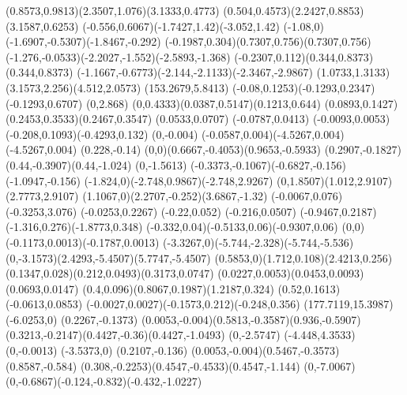 {    \rcurveto(0.8573,0.9813)(2.3507,1.076)(3.1333,0.4773)
    \rcurveto(0.504,0.4573)(2.2427,0.8853)(3.1587,0.6253)
    \rcurveto(-0.556,0.6067)(-1.7427,1.42)(-3.052,1.42)
    \rcurveto(-1.08,0)(-1.6907,-0.5307)(-1.8467,-0.292)
    \rcurveto(-0.1987,0.304)(0.7307,0.756)(0.7307,0.756)
    \rcurveto(-1.276,-0.0533)(-2.2027,-1.552)(-2.5893,-1.368)
    \rcurveto(-0.2307,0.112)(0.344,0.8373)(0.344,0.8373)
    \rcurveto(-1.1667,-0.6773)(-2.144,-2.1133)(-2.3467,-2.9867)
    \rcurveto(1.0733,1.3133)(3.1573,2.256)(4.512,2.0573)
    \moveto(153.2679,5.8413)%
    \rcurveto(-0.08,0.1253)(-0.1293,0.2347)(-0.1293,0.6707)
    \rlineto(0,2.868)
    \rcurveto(0,0.4333)(0.0387,0.5147)(0.1213,0.644)
    \rcurveto(0.0893,0.1427)(0.2453,0.3533)(0.2467,0.3547)
    \rlineto(0.0533,0.0707)
    \rlineto(-0.0787,0.0413)
    \rcurveto(-0.0093,0.0053)(-0.208,0.1093)(-0.4293,0.132)
    \rlineto(0,-0.004)
    \rcurveto(-0.0587,0.004)(-4.5267,0.004)(-4.5267,0.004)
    \rlineto(0.228,-0.14)
    \rcurveto(0,0)(0.6667,-0.4053)(0.9653,-0.5933)
    \rcurveto(0.2907,-0.1827)(0.44,-0.3907)(0.44,-1.024)
    \rlineto(0,-1.5613)
    \rcurveto(-0.3373,-0.1067)(-0.6827,-0.156)(-1.0947,-0.156)
    \rcurveto(-1.824,0)(-2.748,0.9867)(-2.748,2.9267)
    \rcurveto(0,1.8507)(1.012,2.9107)(2.7773,2.9107)
    \rcurveto(1.1067,0)(2.2707,-0.252)(3.6867,-1.32)
    \rlineto(-0.0067,0.076)
    \rlineto(-0.3253,3.076)
    \rlineto(-0.0253,0.2267)
    \rlineto(-0.22,0.052)
    \rlineto(-0.216,0.0507)
    \rcurveto(-0.9467,0.2187)(-1.316,0.276)(-1.8773,0.348)
    \rcurveto(-0.332,0.04)(-0.5133,0.06)(-0.9307,0.06)
    \rcurveto(0,0)(-0.1173,0.0013)(-0.1787,0.0013)
    \rcurveto(-3.3267,0)(-5.744,-2.328)(-5.744,-5.536)
    \rcurveto(0,-3.1573)(2.4293,-5.4507)(5.7747,-5.4507)
    \rcurveto(0.5853,0)(1.712,0.108)(2.4213,0.256)
    \rcurveto(0.1347,0.028)(0.212,0.0493)(0.3173,0.0747)
    \rcurveto(0.0227,0.0053)(0.0453,0.0093)(0.0693,0.0147)
    \rcurveto(0.4,0.096)(0.8067,0.1987)(1.2187,0.324)
    \rlineto(0.52,0.1613)
    \rlineto(-0.0613,0.0853)
    \rcurveto(-0.0027,0.0027)(-0.1573,0.212)(-0.248,0.356)
    \moveto(177.7119,15.3987)%
    \rlineto(-6.0253,0)
    \rlineto(0.2267,-0.1373)
    \rcurveto(0.0053,-0.004)(0.5813,-0.3587)(0.936,-0.5907)
    \rcurveto(0.3213,-0.2147)(0.4427,-0.36)(0.4427,-1.0493)
    \rlineto(0,-2.5747)
    \rlineto(-4.448,4.3533)
    \rlineto(0,-0.0013)
    \rlineto(-3.5373,0)
    \rlineto(0.2107,-0.136)
    \rcurveto(0.0053,-0.004)(0.5467,-0.3573)(0.8587,-0.584)
    \rcurveto(0.308,-0.2253)(0.4547,-0.4533)(0.4547,-1.144)
    \rlineto(0,-7.0067)
    \rcurveto(0,-0.6867)(-0.124,-0.832)(-0.432,-1.0227)
}
